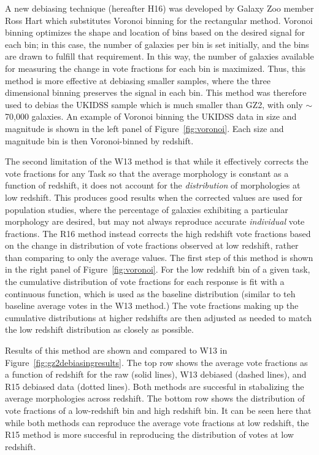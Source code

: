A new debiasing technique (hereafter H16) was developed by Galaxy Zoo member Ross Hart \citep{Hart2016} which substitutes Voronoi binning for the rectangular method. Voronoi binning optimizes the shape and location of bins based on the desired signal for each bin; in this case, the number of galaxies per bin is set initially, and the bins are drawn to fulfill that requirement. In this way, the number of galaxies available for measuring the change in vote fractions for each bin is maximized. Thus, this method is more effective at debiasing smaller samples, where the three dimensional binning preserves the signal in each bin. This method was therefore used to debias the UKIDSS sample which is much smaller than GZ2, with only $\sim$70,000 galaxies. An example of Voronoi binning the UKIDSS data in size and magnitude is shown in the left panel of Figure~\ref{fig:voronoi}. Each size and magnitude bin is then Voronoi-binned by redshift. 

The second limitation of the W13 method is that while it effectively corrects the vote fractions for any Task so that the average morphology is constant as a function of redshift, it does not account for the \emph{distribution} of morphologies at low redshift. This produces good results when the corrected values are used for population studies, where the percentage of galaxies exhibiting a particular morphology are desired, but may not always reproduce accurate \emph{individual} vote fractions. The R16 method instead corrects the high redshift vote fractions based on the change in distribution of vote fractions observed at low redshift, rather than comparing to only the average values. The first step of this method is shown in the right panel of Figure~\ref{fig:voronoi}. For the low redshift bin of a given task, the cumulative distribution of vote fractions for each response is fit with a continuous function, which is used as the baseline distribution (similar to teh baseline average votes in the W13 method.) The vote fractions making up the cumulative distributions at higher redshifts are then adjusted as needed to match the low redshift distribution as closely as possible.

Results of this method are shown and compared to W13 in Figure~\ref{fig:gz2debiasingresults}. The top row shows the average vote fractions as a function of redshift for the raw (solid lines), W13 debiased (dashed lines), and R15 debiased data (dotted lines). Both methods are succesful in stabalizing the average morphologies across redshift. The bottom row shows the distribution of vote fractions of a low-redshift bin and high redshift bin. It can be seen here that while both methods can reproduce the average vote fractions at low redshift, the R15 method is more succesful in reproducing the distribution of votes at low redshift.  
 



